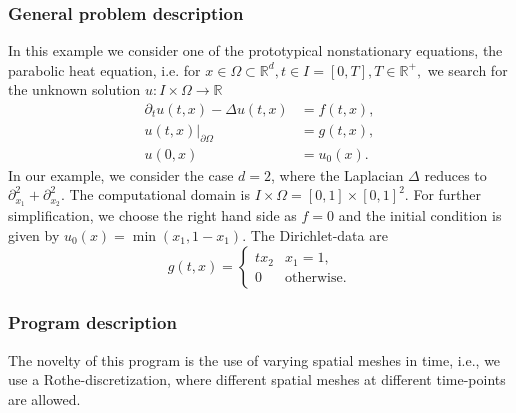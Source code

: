 \subsubsection{General problem description}

In this example we consider one of the prototypical nonstationary equations, the parabolic heat equation, i.e. for $x \in \Omega \subset \mathbb{R}^d, t\in I =[0,T], T\in \mathbb{R}^+,$ we search for the unknown solution $u:I \times \Omega \rightarrow \mathbb{R}$
\begin{align*}
\partial_t u(t,x) - \Delta u(t,x) &= f(t,x),\\
u(t,x)|_{\partial \Omega} &= g(t,x),\\
u(0,x) &= u_0(x).
\end{align*} In our example, we consider the case $d=2$,
where the Laplacian $\Delta$ reduces to $\partial_{x_1}^2 + \partial_{x_2}^2 $. The
computational domain is $ I\times \Omega = [0,1] \times [0,1]^2$. For
further simplification, we choose the right hand side as $f=0$ and the
initial condition is given by $u_0(x) = \min(x_1,1-x_1)$.
The Dirichlet-data are
\[
  g(t,x) = \begin{cases} tx_2 & x_1 = 1,\\
    0 & \text{otherwise.}
  \end{cases}
\]

\subsubsection{Program description}
The novelty of this program is the use of varying spatial meshes in
time, i.e., we use a  Rothe-discretization,
where different spatial meshes at different time-points are allowed.

